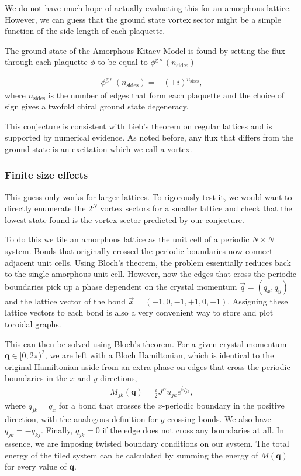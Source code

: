 We do not have much hope of actually evaluating this for an amorphous lattice. However, we can guess that the ground state vortex sector might be a simple function of the side length of each plaquette.

The ground state of the Amorphous Kitaev Model is found by setting the flux through each plaquette \(\phi\) to be equal to \(\phi^{\mathrm{g.s.}}(n_{\mathrm{sides}})\)

\[\begin{aligned}
    \phi^{\mathrm{g.s.}}(n_{\mathrm{sides}}) = -(\pm i)^{n_{\mathrm{sides}}},
\end{aligned}\] where \(n_{\mathrm{sides}}\) is the number of edges that form each plaquette and the choice of sign gives a twofold chiral ground state degeneracy.

This conjecture is consistent with Lieb's theorem on regular lattices \autocite{lieb_flux_1994} and is supported by numerical evidence. As noted before, any flux that differs from the ground state is an excitation which we call a vortex.

\hypertarget{finite-size-effects}{%
\subsubsection{Finite size effects}\label{finite-size-effects}}

This guess only works for larger lattices. To rigorously test it, we would want to directly enumerate the \(2^N\) vortex sectors for a smaller lattice and check that the lowest state found is the vortex sector predicted by our conjecture.

To do this we tile an amorphous lattice as the unit cell of a periodic \(N\times N\) system. Bonds that originally crossed the periodic boundaries now connect adjacent unit cells. Using Bloch's theorem, the problem essentially reduces back to the single amorphous unit cell. However, now the edges that cross the periodic boundaries pick up a phase dependent on the crystal momentum \(\vec{q} = (q_x, q_y)\) and the lattice vector of the bond \(\vec{x} = (+1, 0, -1, +1, 0, -1)\). Assigning these lattice vectors to each bond is also a very convenient way to store and plot toroidal graphs.

This can then be solved using Bloch's theorem. For a given crystal momentum \(\textbf{q} \in [0,2\pi)^2\), we are left with a Bloch Hamiltonian, which is identical to the original Hamiltonian aside from an extra phase on edges that cross the periodic boundaries in the \(x\) and \(y\) directions, \[\begin{aligned}
    M_{jk}(\textbf{q}) =  \frac{i}{2} J^{\alpha} u_{jk} e^{i q_{jk}},\end{aligned}\] where \(q_{jk} = q_x\) for a bond that crosses the \(x\)-periodic boundary in the positive direction, with the analogous definition for \(y\)-crossing bonds. We also have \(q_{jk} = -q_{kj}\). Finally, \(q_{jk} = 0\) if the edge does not cross any boundaries at all. In essence, we are imposing twisted boundary conditions on our system. The total energy of the tiled system can be calculated by summing the energy of \(M( \textbf{q})\) for every value of \(\textbf{q}\).

